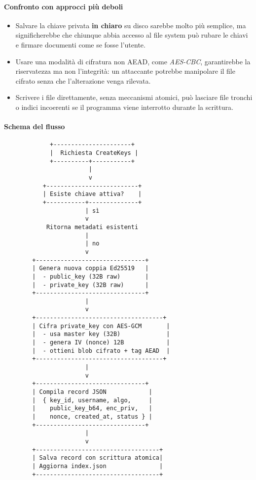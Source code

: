 \paragraph{Confronto con approcci più deboli}
\begin{itemize}
  \item Salvare la chiave privata \textbf{in chiaro} su disco sarebbe molto più semplice, ma significherebbe che chiunque abbia accesso al file system può rubare le chiavi e firmare documenti come se fosse l’utente.
  \item Usare una modalità di cifratura non AEAD, come \textit{AES-CBC}, garantirebbe la riservatezza ma non l’integrità: un attaccante potrebbe manipolare il file cifrato senza che l’alterazione venga rilevata.
  \item Scrivere i file direttamente, senza meccanismi atomici, può lasciare file tronchi o indici incoerenti se il programma viene interrotto durante la scrittura.
\end{itemize}

\clearpage
\paragraph{Schema del flusso}
\begin{verbatim}
             +----------------------+
             |  Richiesta CreateKeys |
             +----------+-----------+
                        |
                        v
           +--------------------------+
           | Esiste chiave attiva?    |
           +-----------+--------------+
                       | sì
                       v
            Ritorna metadati esistenti
                       |
                       | no
                       v
        +-------------------------------+
        | Genera nuova coppia Ed25519   |
        |  - public_key (32B raw)       |
        |  - private_key (32B raw)      |
        +-------------------------------+
                       |
                       v
        +------------------------------------+
        | Cifra private_key con AES-GCM       |
        |  - usa master key (32B)             |
        |  - genera IV (nonce) 12B            |
        |  - ottieni blob cifrato + tag AEAD  |
        +------------------------------------+
                       |
                       v
        +-------------------------------+
        | Compila record JSON            |
        |  { key_id, username, algo,     |
        |    public_key_b64, enc_priv,   |
        |    nonce, created_at, status } |
        +-------------------------------+
                       |
                       v
        +-----------------------------------+
        | Salva record con scrittura atomica|
        | Aggiorna index.json               |
        +-----------------------------------+

\end{verbatim}

